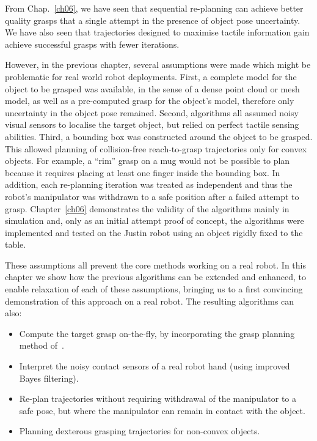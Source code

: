 

From Chap.~\ref{ch06}, we have seen that sequential re-planning can achieve better quality grasps that a single attempt in the presence of object pose uncertainty. We have also seen that trajectories designed to maximise tactile information gain achieve successful grasps with fewer iterations.

However, in the previous chapter, several assumptions were made which might be problematic for real world robot deployments. First, a complete model for the object to be grasped was available, in the sense of a dense point cloud or mesh model, as well as a pre-computed grasp for the object's model, therefore only uncertainty in the object pose remained. Second, algorithms all assumed noisy visual sensors to localise the target object, but relied on perfect tactile sensing abilities. Third, a bounding box was constructed around the object to be grasped. This allowed planning of collision-free reach-to-grasp trajectories only for convex objects. For example, a ``rim'' grasp on a mug would not be possible to plan because it requires placing at least one finger inside the bounding box.   
In addition, each re-planning iteration was treated as independent and thus the robot's manipulator was withdrawn to a safe position after a failed attempt to grasp. Chapter~\ref{ch06} demonstrates the validity of the algorithms mainly in simulation and, only as an initial attempt proof of concept, the algorithms were implemented and tested on the Justin robot using an object rigidly fixed to the table.

These assumptions all prevent the core methods working on a real robot. In this chapter we show how the previous algorithms can be extended and enhanced, to enable relaxation of each of these assumptions, bringing us to a first convincing demonstration of this approach on a real robot. The resulting algorithms can also:
\begin{itemize}
\item Compute the target grasp on-the-fly, by incorporating the grasp planning method of~\citep{bib:kopicki_2014}.
\item Interpret the noisy contact sensors of a real robot hand (using improved Bayes filtering).
\item Re-plan trajectories without requiring withdrawal of the manipulator to a safe pose, but where the manipulator can remain in contact with the object.
\item Planning dexterous grasping trajectories for non-convex objects.
\end{itemize}

